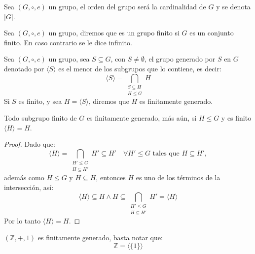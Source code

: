 \begin{defi}
	Sea $(G, \circ, e)$ un grupo, el orden del grupo será la cardinalidad de $G$ y se denota $|G|$.
\end{defi}

\begin{defi}
	Sea $(G, \circ, e)$ un grupo, diremos que es un grupo finito si $G$ es un conjunto finito. En caso contrario se le dice infinito.
\end{defi}

\begin{defi}
	Sea $(G, \circ, e)$ un grupo, sea $S \subseteq G$, con $S \neq \emptyset$, el grupo generado por $S$ en $G$ denotado por $\langle S \rangle$ es el menor de los subgrupos que lo contiene, es decir:
	\begin{equation*}
		\langle S \rangle = \bigcap_{\substack{S \subseteq H \\ H \le G}} H
	\end{equation*}
	Si $S$ es finito, y sea $H = \langle S \rangle$, diremos que $H$ es finitamente generado.
\end{defi}

\begin{eje}
	Todo subgrupo finito de $G$ es finitamente generado, más aún, si $H \le G$ y es finito $\langle H \rangle = H$.
\end{eje}

\begin{proof}
	Dado que:
	\begin{equation*}
		\langle H \rangle = \bigcap_{\substack{H' \le G \\ H \subseteq H'}} H' \subseteq H' \quad \forall H' \le G \text{ tales que } H \subseteq H',
	\end{equation*}
	además como $H \le G$ y $H \subseteq H$, entonces $H$ es uno de los términos de la intersección, así:
	\begin{equation*}
		\langle H \rangle \subseteq H \land H \subseteq \bigcap_{\substack{H' \le G \\ H \subseteq H'}} H' = \langle H \rangle
	\end{equation*}
	Por lo tanto $\langle H \rangle = H$.
\end{proof}

\begin{eje}
	$(\mathbb{Z}, +, 1)$ es finitamente generado, basta notar que:
	\begin{equation*}
		\mathbb{Z} = \langle \{1\} \rangle
	\end{equation*}
\end{eje}

